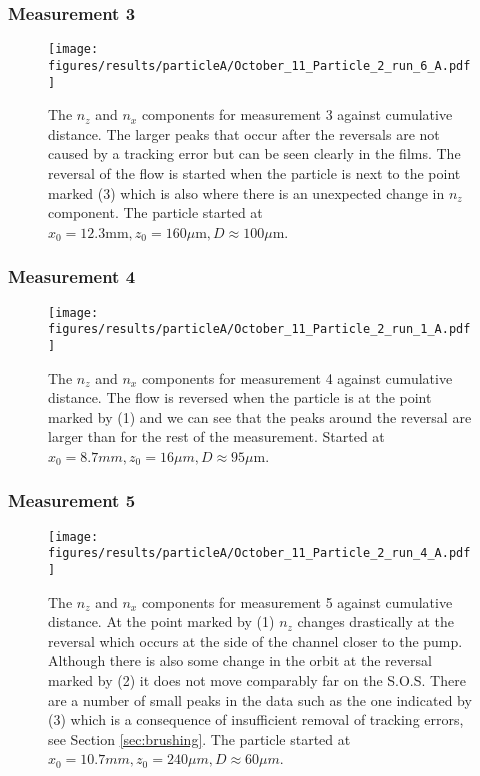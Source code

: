\subsubsection{Measurement 3}
\begin{figure}[H]
\begin{center}
\texttt{[image: figures/results/particleA/October\_11\_Particle\_2\_run\_6\_A.pdf]}
\end{center}
\caption{The $n_z$ and $n_x$ components for measurement 3 against cumulative distance. The larger peaks that occur after the reversals are not caused by a tracking error but can be seen clearly in the films. The reversal of the flow is started when the particle is next to the point marked (3) which is also where there is an unexpected change in $n_z$ component. The particle started at $ x_0 = 12.3 \text{mm}, z_0 = 160 \mu\text{m}, D \approx 100\mu$m.}
\label{fig:particleA3}
\end{figure}



\subsubsection{Measurement 4}
\begin{figure}[H]
\begin{center}
\texttt{[image: figures/results/particleA/October\_11\_Particle\_2\_run\_1\_A.pdf]}
\end{center}
\caption{The $n_z$ and $n_x$ components for measurement 4 against cumulative distance. The flow is reversed when the particle is at the point marked by (1) and we can see that the peaks around the reversal are larger than for the rest of the measurement. Started at $x_0 = 8.7 mm, z_0 = 16\mu m, D \approx 95\mu$m.}
\label{fig:particleA4}
\end{figure}

\subsubsection{Measurement 5}
\begin{figure}[H]
\centering
\texttt{[image: figures/results/particleA/October\_11\_Particle\_2\_run\_4\_A.pdf]}
\caption{The $n_z$ and $n_x$ components for measurement 5 against cumulative distance. At the point marked by (1) $n_z$ changes drastically at the reversal which occurs at the side of the channel closer to the pump. Although there is also some change in the orbit at the reversal marked by (2) it does not move comparably far on the S.O.S. There are a number of small peaks in the data such as the one indicated by (3) which is a consequence of insufficient removal of tracking errors, see Section \ref{sec:brushing}. The particle started at $x_0 = 10.7 mm, z_0 = 240 \mu m, D \approx 60\mu m$.}
\label{fig:particleA5}
\end{figure}

